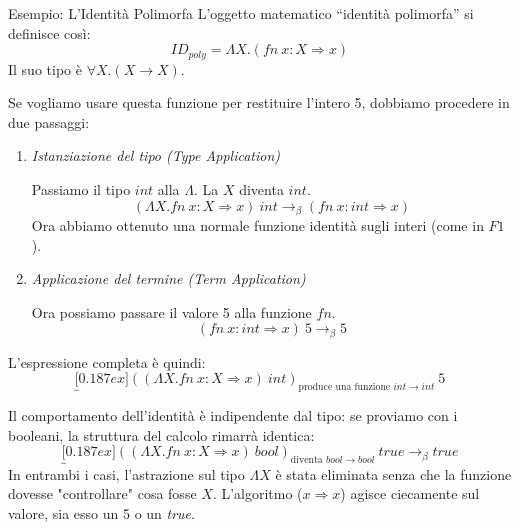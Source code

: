\documentclass[a4paper,11pt]{report}
\begin{document}
\begin{gframe}{Esempio: L'Identità Polimorfa}{}
    L'oggetto matematico ``identità polimorfa'' si definisce così:
    \[
    ID_{poly} = \Lambda X . (fn \ x : X \Rightarrow x)
    \]
    Il suo tipo è \( \forall X . (X \to X) \).
    
    Se vogliamo usare questa funzione per restituire l'intero 5, dobbiamo procedere in due passaggi:
    \begin{enumerate}
        \item \textit{Istanziazione del tipo (Type Application)}
        
            Passiamo il tipo \( int \) alla \( \Lambda \). La \( X \) diventa \( int \).
        \[ (\Lambda X . fn \ x : X \Rightarrow x) \ int \longrightarrow_{\beta} (fn \ x : int \Rightarrow x) \]
        Ora abbiamo ottenuto una normale funzione identità sugli interi (come in \( F1 \)).
        
        \item \textit{Applicazione del termine (Term Application)}
        
            Ora possiamo passare il valore 5 alla funzione \( fn \).
        \[ (fn \ x : int \Rightarrow x) \ 5 \longrightarrow_{\beta} 5 \]
    \end{enumerate}
    
    L'espressione completa è quindi:
    \[
    \underbracket[0.187ex]{((\Lambda X . fn \ x : X \Rightarrow x) \ int)}_{\text{produce una funzione } int \to int} \ 5
    \]

    Il comportamento dell'identità è indipendente dal tipo: se proviamo con i booleani, la struttura del calcolo rimarrà identica:
    \[
    \underbracket[0.187ex]{((\Lambda X . fn \ x : X \Rightarrow x) \ bool)}_{\text{diventa } bool \to bool} \ true \longrightarrow_{\beta} true
    \]
    In entrambi i casi, l'astrazione sul tipo \( \Lambda X \) è stata eliminata senza che la funzione dovesse "controllare" cosa fosse \( X \). L'algoritmo ($x \Rightarrow x$) agisce ciecamente sul valore, sia esso un 5 o un \textit{true}.

    \end{gframe}
\end{document}
